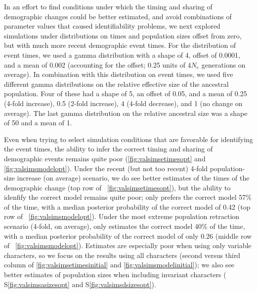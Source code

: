 In an effort to find conditions under which the timing and sharing of
demographic changes could be better estimated, and avoid combinations
of parameter values that caused identifiability problems,
we next explored simulations under distributions on times and population sizes
offset from zero, but with much more recent demographic event times.
For the distribution of event times, we used a gamma distribution
with a shape of 4, offset of 0.0001, and a mean of 0.002 (accounting
for the offset; 0.25 units of $4N_e$ generations on average).
In combination with this distribution on event times,
we used five different gamma distributions on the relative
effective size of the ancestral population.
Four of these had a shape of 5, an offset of 0.05, and a mean
of
0.25 (4-fold increase),
0.5 (2-fold increase),
4 (4-fold decrease),
and
1 (no change on average).
The last gamma distribution on the relative ancestral size was a shape of 50
and a mean of 1.

Even when trying to select simulation conditions that are favorable for
identifying the event times, the ability to infer the correct timing and
sharing of demographic events remains quite poor
(\figs \ref{fig:valsimsetimesopt} and \ref{fig:valsimsmodelopt}).
Under the recent (but not too recent) 4-fold population-size increase (on
average) scenario, we do see better estimates of the times of the demographic
change
(top row of \fig{}~\ref{fig:valsimsetimesopt}),
but the ability to idenfify the correct model remains quite poor;
\ecoevolity only prefers the correct model 57\% of the time, with
a median posterior probability of the correct model of 0.42
(top row of \fig{}~\ref{fig:valsimsmodelopt}).
Under the most extreme population retraction scenario (4-fold, on average),
\ecoevolity only estimates the correct model 40\% of the time, with a median
posterior probability of the correct model of only 0.26
(middle row of \fig{}~\ref{fig:valsimsmodelopt}).
Estimates are especially poor when using only variable characters,
so we focus on the results using all characters
(second versus third column of \figs
\ref{fig:valsimsetimesinitial}
and
\ref{fig:valsimsmodelinitial});
we also see better estimates of population sizes when including invariant
characters
(\figs
S\ref{fig:valsimsasizesopt}
and 
S\ref{fig:valsimsdsizesopt}).

